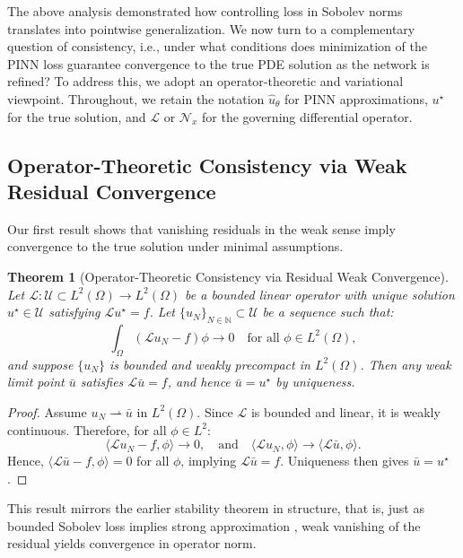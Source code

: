 \documentclass[11pt, a4paper]{article}
\newtheorem{thm}{Theorem}
\begin{document}
The above analysis demonstrated how controlling loss in Sobolev norms translates into pointwise generalization. We now turn to a complementary question of consistency, i.e., under what conditions does minimization of the PINN loss guarantee convergence to the true PDE solution as the network is refined? To address this, we adopt an operator-theoretic and variational viewpoint. Throughout, we retain the notation $\hat{u}_\theta$ for PINN approximations, $u^\star$ for the true solution, and $\mathcal{L}$ or $\mathcal{N}_x$ for the governing differential operator.

\subsection{Operator-Theoretic Consistency via Weak Residual Convergence}

Our first result shows that vanishing residuals in the weak sense imply convergence to the true solution under minimal assumptions.

\begin{thm}[Operator-Theoretic Consistency via Residual Weak Convergence]
Let $\mathcal{L} \colon \mathcal{U} \subset L^2(\Omega) \to L^2(\Omega)$ be a bounded linear operator with unique solution $u^\star \in \mathcal{U}$ satisfying $\mathcal{L} u^\star = f$. Let $\{ u_N \}_{N \in \mathbb{N}} \subset \mathcal{U}$ be a sequence such that:
\[
\int_\Omega \left( \mathcal{L} u_N - f \right) \phi \to 0 \quad \text{for all } \phi \in L^2(\Omega),
\]
and suppose $\{ u_N \}$ is bounded and weakly precompact in $L^2(\Omega)$. Then any weak limit point $\bar{u}$ satisfies $\mathcal{L} \bar{u} = f$, and hence $\bar{u} = u^\star$ by uniqueness.
\end{thm}

\begin{proof}
Assume $u_N \rightharpoonup \bar{u}$ in $L^2(\Omega)$. Since $\mathcal{L}$ is bounded and linear, it is weakly continuous. Therefore, for all $\phi \in L^2$:
\[
\langle \mathcal{L} u_N - f, \phi \rangle \to 0, \quad \text{and} \quad \langle \mathcal{L} u_N, \phi \rangle \to \langle \mathcal{L} \bar{u}, \phi \rangle.
\]
Hence, $\langle \mathcal{L} \bar{u} - f, \phi \rangle = 0$ for all $\phi$, implying $\mathcal{L} \bar{u} = f$. Uniqueness then gives $\bar{u} = u^\star$.
\end{proof}

This result mirrors the earlier stability theorem in structure, that is, just as bounded Sobolev loss implies strong approximation \cite{attouch2006}, weak vanishing of the residual yields convergence in operator norm.
\end{document}
